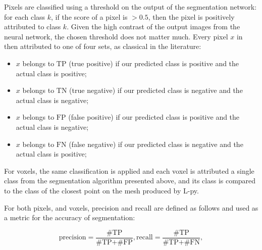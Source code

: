 Pixels are classified using a threshold on the output of the segmentation
network: for each class $k$, if the score of a pixel is $>0.5$, then the pixel is
positively attributed to class $k$. Given the high contrast of the output images
from the neural network, the chosen threshold does not matter much. Every pixel
$x$ in then attributed to one of four sets, as classical in the literature:

\begin{itemize}
    \item $x$ belongs to $\textrm{TP}$ (true positive) if our predicted class is positive and the actual class is
positive;
    \item $x$ belongs to $\textrm{TN}$ (true negative) if our predicted class is negative and the actual class is
negative;
    \item $x$ belongs to $\textrm{FP}$ (false positive) if our predicted class is positive and the actual class is
negative;
    \item $x$ belongs to $\textrm{FN}$ (false negative) if our predicted class is negative and the actual class is
positive;
\end{itemize}

For voxels, the same classification is applied and each voxel is attributed a single class
from the segmentation algorithm presented above, and its class is compared to
the class of the closest point on the mesh produced by L-py.

For both pixels, and voxels, precision and recall are defined as follows and
used as a metric for the accuracy of segmentation:

$$
    \textrm{precision} = \frac{\textrm{\# TP} }{\textrm{\# TP} + \textrm{\# FP}},
    \textrm{recall} = \frac{\textrm{\# TP} }{\textrm{\# TP} + \textrm{\# FN}},
$$

